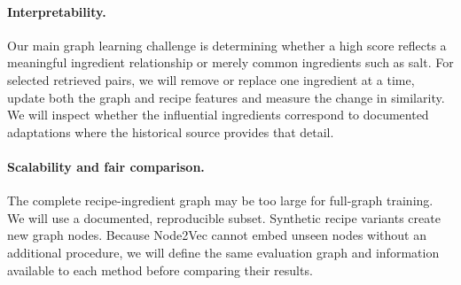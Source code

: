 \documentclass{article}
\begin{document}
\paragraph{Interpretability.}
Our main graph learning challenge is determining whether a high score
reflects a meaningful ingredient relationship or merely common
ingredients such as salt. For selected retrieved pairs, we will remove
or replace one ingredient at a time, update both the graph and recipe
features and measure the change in similarity. We will inspect whether
the influential ingredients correspond to documented adaptations where
the historical source provides that detail.

\paragraph{Scalability and fair comparison.}
The complete recipe-ingredient graph may be too large for full-graph
training. We will use a documented, reproducible subset. Synthetic recipe variants create new graph nodes. Because Node2Vec cannot embed unseen nodes without an additional procedure, we will define the same evaluation graph and information
available to each method before comparing their results.

 

\end{document}
